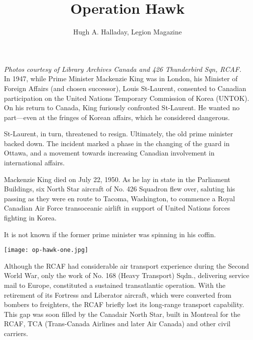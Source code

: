 %


\title{Operation Hawk}
\author{Hugh A. Halladay, Legion Magazine}

\maketitle

\textit{Photos courtesy of Library Archives Canada and 426 Thunderbird
  Sqn, RCAF.}\\

In 1947, while Prime Minister Mackenzie King was in London, his
Minister of Foreign Affairs (and chosen successor), Louis St-Laurent,
consented to Canadian participation on the United Nations Temporary
Commission of Korea (UNTOK). On his return to Canada, King furiously
confronted St-Laurent. He wanted no part---even at the fringes of
Korean affairs, which he considered dangerous.

St-Laurent, in turn, threatened to resign. Ultimately, the old prime
minister backed down. The incident marked a phase in the changing of
the guard in Ottawa, and a movement towards increasing Canadian
involvement in international affairs.

Mackenzie King died on July 22, 1950. As he lay in state in the
Parliament Buildings, six North Star aircraft of No. 426 Squadron flew
over, saluting his passing as they were en route to Tacoma,
Washington, to commence a Royal Canadian Air Force transoceanic
airlift in support of United Nations forces fighting in Korea.

It is not known if the former prime minister was spinning in his
coffin.

\begin{figure*}[htbp]
   \vspace{2em}
   \centering
   \texttt{[image: op-hawk-one.jpg]}
   \label{fig:op-hawk-one.eps}
\end{figure*}

Although the RCAF had considerable air transport experience during
the Second World War, only the work of No. 168 (Heavy Transport)
Sqdn., delivering service mail to Europe, constituted a sustained
transatlantic operation. With the retirement of its Fortress and
Liberator aircraft, which were converted from bombers to freighters,
the RCAF briefly lost its long-range transport capability. This gap
was soon filled by the Canadair North Star, built in Montreal for the
RCAF, TCA (Trans-Canada Airlines and later Air Canada) and other civil
carriers.


